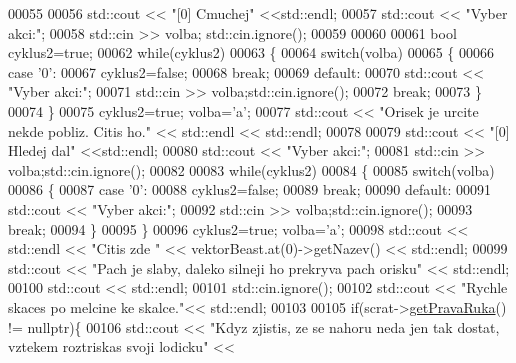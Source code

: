 \begin{DoxyCode}
00055 
00056     std::cout << \textcolor{stringliteral}{"[0] Cmuchej"} <<std::endl;
00057     std::cout << \textcolor{stringliteral}{"Vyber akci:"};
00058     std::cin >> volba; std::cin.ignore();
00059 
00060 
00061     \textcolor{keywordtype}{bool} cyklus2=\textcolor{keyword}{true};
00062     \textcolor{keywordflow}{while}(cyklus2)
00063     \{
00064         \textcolor{keywordflow}{switch}(volba)
00065         \{
00066             \textcolor{keywordflow}{case} \textcolor{charliteral}{'0'}:
00067                 cyklus2=\textcolor{keyword}{false};
00068                 \textcolor{keywordflow}{break};
00069             \textcolor{keywordflow}{default}:
00070                 std::cout << \textcolor{stringliteral}{"Vyber akci:"};
00071                 std::cin >> volba;std::cin.ignore();
00072                 \textcolor{keywordflow}{break};
00073         \}
00074     \}
00075     cyklus2=\textcolor{keyword}{true}; volba=\textcolor{charliteral}{'a'};
00077     std::cout << \textcolor{stringliteral}{"Orisek je urcite nekde pobliz. Citis ho."} << std::endl << std::endl;
00078 
00079     std::cout << \textcolor{stringliteral}{"[0] Hledej dal"} <<std::endl;
00080     std::cout << \textcolor{stringliteral}{"Vyber akci:"};
00081     std::cin >> volba;std::cin.ignore();
00082 
00083     \textcolor{keywordflow}{while}(cyklus2)
00084     \{
00085         \textcolor{keywordflow}{switch}(volba)
00086         \{
00087             \textcolor{keywordflow}{case} \textcolor{charliteral}{'0'}:
00088                 cyklus2=\textcolor{keyword}{false};
00089                 \textcolor{keywordflow}{break};
00090             \textcolor{keywordflow}{default}:
00091                 std::cout << \textcolor{stringliteral}{"Vyber akci:"};
00092                 std::cin >> volba;std::cin.ignore();
00093                 \textcolor{keywordflow}{break};
00094         \}
00095     \}
00096     cyklus2=\textcolor{keyword}{true}; volba=\textcolor{charliteral}{'a'};
00098     std::cout << std::endl << \textcolor{stringliteral}{"Citis zde "} << vektorBeast.at(0)->getNazev() << std::endl;
00099     std::cout << \textcolor{stringliteral}{"Pach je slaby, daleko silneji ho prekryva pach orisku"} << std::endl;
00100     std::cout << std::endl;
00101     std::cin.ignore();
00102     std::cout << \textcolor{stringliteral}{"Rychle skaces po melcine ke skalce."}<< std::endl;
00103 
00105     \textcolor{keywordflow}{if}(scrat->\hyperlink{classIceAge_1_1ObleceneVybaveniVeverky_a0ca3d404578b0099b97fc7910d5e718a}{getPravaRuka}() != \textcolor{keyword}{nullptr})\{
00106         std::cout << \textcolor{stringliteral}{"Kdyz zjistis, ze se nahoru neda jen tak dostat, vztekem roztriskas svoji lodicku"} << 

\end{DoxyCode}
